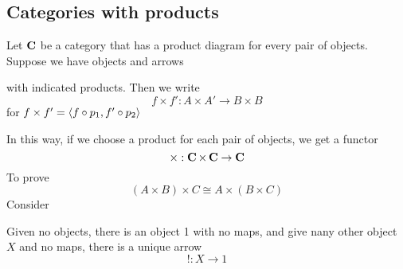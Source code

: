 \documentclass[11pt]{article}
\begin{document}
\subsection{Categories with products}
\label{sec:org093c9fe}
Let \(\operatorname{\textbf{C}}\) be a category that has a product diagram for every pair of
objects. Suppose we have objects and arrows
\begin{center}\end{center}
with indicated products. Then we write
\begin{equation*}
f\times f':A\times A'\to B\times B
\end{equation*}
for \(f\times f'=\langle f\circ p_1,f'\circ p_2\rangle\)
\begin{center}\end{center}     In this way, if we choose a product for each
pair of objects, we get a functor
\begin{equation*}
\times:\operatorname{\textbf{C}}\times\operatorname{\textbf{C}}\to\operatorname{\textbf{C}}
\end{equation*}
To prove
\begin{equation*}
(A\times B)\times C\cong A\times (B\times C)
\end{equation*}
Consider
\begin{center}\end{center}


Given no objects, there is an object 1 with no maps, and give nany other
object \(X\) and no maps, there is a unique arrow
\begin{equation*}
!:X\to 1
\end{equation*}
\end{document}
